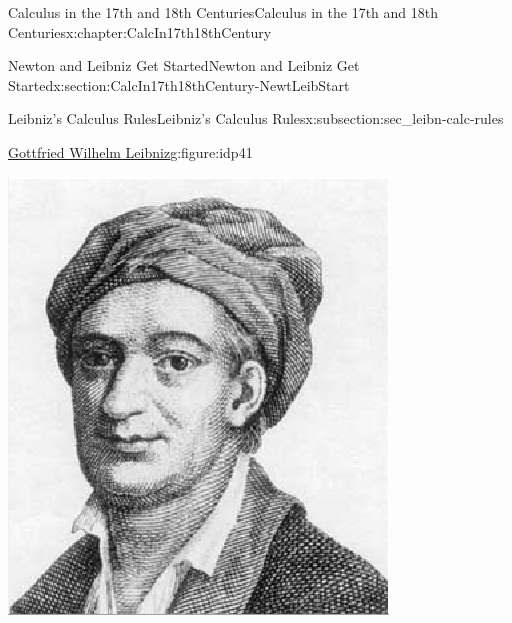 
\typeout{************************************************}
\typeout{************************************************}
%
\begin{chapterptx}{Calculus in the 17th and 18th Centuries}{}{Calculus in the 17th and 18th Centuries}{}{}{x:chapter:CalcIn17th18thCentury}
	\typeout{************************************************}
	\typeout{************************************************}
	\begin{sectionptx}{Newton and Leibniz Get Started}{}{Newton and Leibniz Get Started}{}{}{x:section:CalcIn17th18thCentury-NewtLeibStart}
		\typeout{************************************************}
		\typeout{************************************************}
		\begin{subsectionptx}{Leibniz's Calculus Rules}{}{Leibniz's Calculus Rules}{}{}{x:subsection:sec_leibn-calc-rules}
			\begin{figureptx}{\href{https://mathshistory.st-andrews.ac.uk/Biographies/Leibniz/}{Gottfried Wilhelm Leibniz}\protect\footnotemark{}}{g:figure:idp41}{}%
				\begin{image}{0.325}{0.35}{0.325}%
					\includegraphics[width=\linewidth]{external/images/Leibniz.png}

\end{image}
\end{figureptx}
\end{subsectionptx}
\end{sectionptx}
\end{chapterptx}
